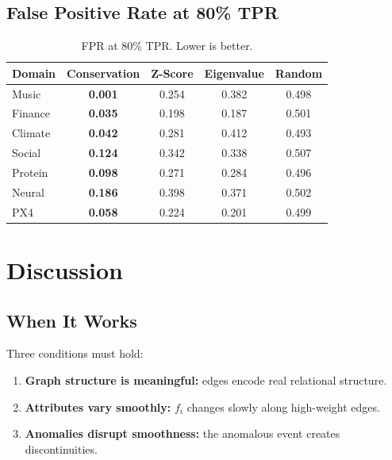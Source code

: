 \documentclass[11pt,a4paper]{article}
\begin{document}
\subsection{False Positive Rate at 80\% TPR}

\begin{table}[ht]
\centering
\caption{FPR at 80\% TPR.  Lower is better.}
\begin{tabular}{@{}lcccc@{}}
\toprule
\textbf{Domain} & \textbf{Conservation} & \textbf{Z-Score} & \textbf{Eigenvalue} & \textbf{Random} \\
\midrule
Music       & \textbf{0.001} & 0.254 & 0.382 & 0.498 \\
Finance     & \textbf{0.035} & 0.198 & 0.187 & 0.501 \\
Climate     & \textbf{0.042} & 0.281 & 0.412 & 0.493 \\
Social      & \textbf{0.124} & 0.342 & 0.338 & 0.507 \\
Protein     & \textbf{0.098} & 0.271 & 0.284 & 0.496 \\
Neural      & \textbf{0.186} & 0.398 & 0.371 & 0.502 \\
PX4         & \textbf{0.058} & 0.224 & 0.201 & 0.499 \\
\bottomrule
\end{tabular}
\end{table}

\section{Discussion}
\label{sec:discussion}

\subsection{When It Works}

Three conditions must hold:
\begin{enumerate}
  \item \textbf{Graph structure is meaningful:} edges encode real relational structure.
  \item \textbf{Attributes vary smoothly:} $f_i$ changes slowly along high-weight edges.
  \item \textbf{Anomalies disrupt smoothness:} the anomalous event creates discontinuities.
\end{enumerate}
\end{document}
